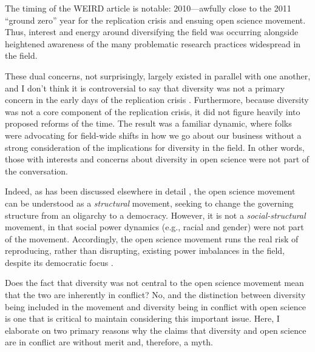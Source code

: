 \documentclass[authordate, empirical]{jote-new-article}
\begin{document}
The timing of the \textcite{Henrich2010} WEIRD article is notable: 2010—awfully close to the 2011 “ground zero” year for the replication crisis and ensuing open science movement. Thus, interest and energy around diversifying the field was occurring alongside heightened awareness of the many problematic research practices widespread in the field.







These dual concerns, not surprisingly, largely existed in parallel with one another, and I don't think it is controversial to say that diversity was not a primary concern in the early days of the replication crisis \parencites[e.g.,][]{Beer2023}{Lewis2017}. Furthermore, because diversity was not a core component of the replication crisis, it did not figure heavily into proposed reforms of the time. The result was a familiar dynamic, where folks were advocating for field-wide shifts in how we go about our business without a strong consideration of the implications for diversity in the field. In other words, those with interests and concerns about diversity in open science were not part of the conversation.







Indeed, as has been discussed elsewhere in detail \parencites{Syed2022}, the open science movement can be understood as a \emph{structural} movement, seeking to change the governing structure from an oligarchy to a democracy. However, it is not a \emph{social-structural} movement, in that social power dynamics (e.g., racial and gender) were not part of the movement. Accordingly, the open science movement runs the real risk of reproducing, rather than disrupting, existing power imbalances in the field, despite its democratic focus \parencites{Grzanka2021}.







Does the fact that diversity was not central to the open science movement mean that the two are inherently in conflict? No, and the distinction between diversity being included in the movement and diversity being in conflict with open science is one that is critical to maintain considering this important issue. Here, I elaborate on two primary reasons why the claims that diversity and open science are in conflict are without merit and, therefore, a myth.
\end{document}
